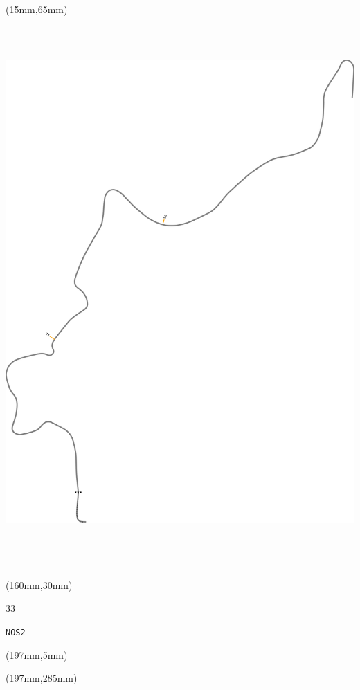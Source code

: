 \begin{textblock*}{185mm}(15mm,65mm)%
\centering
\mbox{\includegraphics[width=185mm,height=210mm,keepaspectratio]{PT/NOS2.pdf}}
\end{textblock*}
\begin{textblock*}{40mm}(160mm,30mm)%
\Large
\par{} 
\par33 
\par\hfill\tiny\tt NOS2\\
\end{textblock*}
\begin{textblock*}{20mm}(197mm,5mm)%
\fbox{\thepage}
\label{NOS2}
\end{textblock*}
\begin{textblock*}{20mm}(197mm,285mm)%
\fbox{\thepage}
\end{textblock*}

